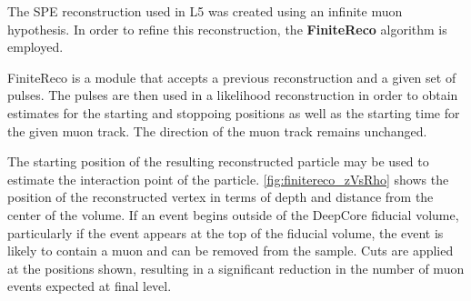 The SPE reconstruction used in L5 was created using an infinite muon hypothesis. 
In order to refine this reconstruction, the \textbf{FiniteReco} algorithm is employed.

FiniteReco is a module that accepts a previous reconstruction and a given set of pulses.
The pulses are then used in a likelihood reconstruction in order to obtain estimates for the starting and stoppoing positions as well as the starting time for the given muon track.
The direction of the muon track remains unchanged.

The starting position of the resulting reconstructed particle may be used to estimate the interaction point of the particle.
\ref{fig:finitereco_zVsRho} shows the position of the reconstructed vertex in terms of depth and distance from the center of the volume.
If an event begins outside of the DeepCore fiducial volume, particularly if the event appears at the top of the fiducial volume, the event is likely to contain a muon and can be removed from the sample.
Cuts are applied at the positions shown, resulting in a significant reduction in the number of muon events expected at final level.





